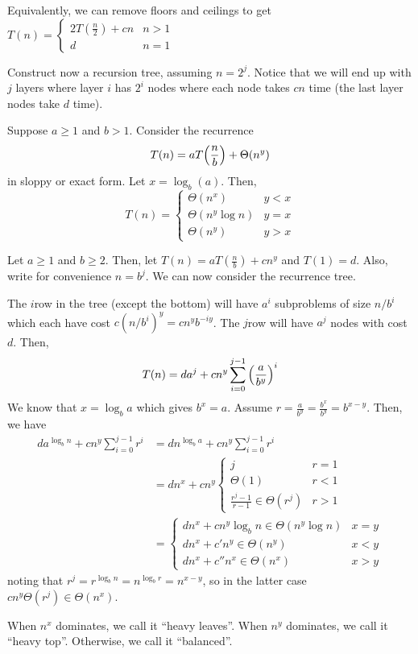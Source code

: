 Equivalently, we can  remove floors and ceilings to get $T(n) = \begin{cases}
    2T(\frac{n}{2}) + cn & n > 1 \\
    d                    & n = 1
  \end{cases}$

Construct now a recursion tree, assuming $n = 2^j$.
Notice that we will end up with $j$ layers where layer $i$ has $2^i$ nodes
where each node takes $cn$ time (the last layer nodes take $d$ time).


\begin{theorem}
  Suppose $a \geq 1$ and $b > 1$. Consider the recurrence
  \[ T(n) = a T\qty(\frac{n}{b}) + \Theta(n^y) \]
  in sloppy or exact form. Let $x = \log_b(a)$. Then,
  \[
    T(n) = \begin{cases}
      \Theta(n^x)       & y < x \\
      \Theta(n^y\log n) & y = x \\
      \Theta(n^y)       & y > x
    \end{cases}
  \]
\end{theorem}
\begin{prf}
  Let $a \geq 1$ and $b \geq 2$.
  Then, let $T(n) = aT(\frac{n}{b}) + cn^y$ and $T(1) = d$.
  Also, write for convenience $n = b^j$.
  We can now consider the recurrence tree.

  The $i$\xth row in the tree (except the bottom) will have $a^i$ subproblems
  of size $n/b^i$ which each have cost $c(n/b^i)^y = c n^y b^{-iy}$.
  The $j$\xth row will have $a^j$ nodes with cost $d$.
  Then,
  \[
    T(n) = d a^j + c n^y \sum_{i=0}^{j-1} \qty(\frac{a}{b^y})^i
  \]
  We know that $x = \log_b a$ which gives $b^x = a$.
  Assume $r = \frac{a}{b^y} = \frac{b^x}{b^y} = b^{x-y}$.
  Then, we have
  \begin{align*}
    d a^{\log_b n} + c n^y \sum_{i=0}^{j-1}r^i
     & = d n^{\log_b a} + c n^y \sum_{i=0}^{j-1} r^i             \\
     & = d n^x + c n^y \begin{cases}
                         j                                 & r = 1 \\
                         \Theta(1)                         & r < 1 \\
                         \frac{r^j-1}{r-1} \in \Theta(r^j) & r > 1
                       \end{cases} \\
     & = \begin{cases}
           d n^x + cn^y \log_b n \in \Theta(n^y\log n) & x = y \\
           d n^x + c'n^y         \in \Theta(n^y)       & x < y \\
           d n^x + c''n^x        \in \Theta(n^x)       & x > y
         \end{cases}
  \end{align*}
  noting that $r^j = r^{\log_b n} = n^{\log_b r} = n^{x-y}$,
  so in the latter case $c n^y \Theta(r^j) \in \Theta(n^x)$.
\end{prf}

When $n^x$ dominates, we call it ``heavy leaves''.
When $n^y$ dominates, we call it ``heavy top''.
Otherwise, we call it ``balanced''.
